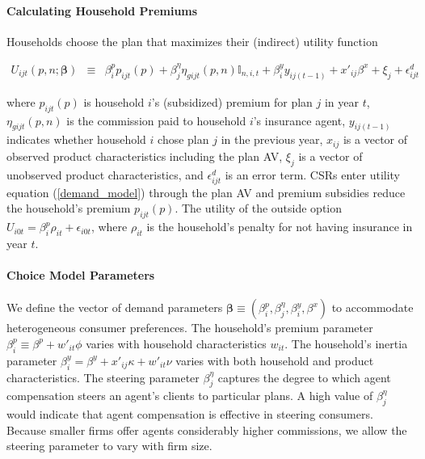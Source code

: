 \documentclass[12pt]{article}
\begin{document}
\paragraph{Calculating Household Premiums}


Households choose the plan that maximizes their (indirect) utility function

	\vspace{-0.4in}

	

	\begin{eqnarray}\label{demand_model}
	U_{ijt}(\textit{p},\textit{n};\boldsymbol{\beta}) &\equiv& \beta_{i}^p p_{ijt}(\textit{p}) + \beta_j^{\eta} \eta_{gijt}(\textit{p},\textit{n})  \mathbb{I}_{n,i,t}   + \beta_i^y y_{ij(t-1)} + x'_{ij}\beta^x + \xi_{j} + \epsilon_{ijt}^d
	\end{eqnarray}
	
	\vspace{-0.1in}		
	

\noindent where $p_{ijt}(\textit{p})$ is household $i$'s (subsidized) premium for plan $j$ in year $t$, $\eta_{gijt}(\textit{p},\textit{n})$ is the commission paid to household $i$'s insurance agent, $y_{ij(t-1)}$ indicates whether household $i$ chose plan $j$ in the previous year, $x_{ij}$ is a vector of observed product characteristics including the plan AV,  $\xi_{j}$ is a vector of unobserved product characteristics, and $\epsilon_{ijt}^d$ is an error term.  CSRs enter utility equation (\ref{demand_model}) through the plan AV and premium subsidies reduce the household's premium $p_{ijt}(\textit{p})$.   The utility of the outside option $U_{i0t} = \beta_i^p \rho_{it} + \epsilon_{i0t}$, where $\rho_{it}$ is the household's penalty for not having insurance in year $t$. 


\paragraph{Choice Model Parameters}

We define the vector of demand parameters $\boldsymbol{\beta} \equiv (\beta_i^p,\beta_j^{\eta},\beta_i^y,\beta^x)$ to accommodate heterogeneous consumer preferences.  The household's premium parameter $\beta_{i}^p \equiv \beta^p + w'_{it} \phi$ varies with household characteristics $w_{it}$.  The household's inertia parameter $\beta_i^y = \beta^y +  x'_{ij} \kappa + w'_{it} \nu$ varies with both household and product characteristics. The steering parameter $\beta_j^{\eta}$ captures the degree to which agent compensation steers  an agent's clients to particular plans.  A high value of $\beta_j^{\eta}$ would indicate that agent compensation is effective in steering consumers.   Because smaller firms offer agents considerably higher commissions, we allow the steering parameter to vary with firm size.
\end{document}
